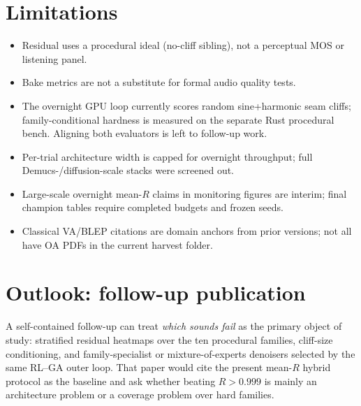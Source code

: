 \section{Limitations}
\label{sec:limitations}

\begin{itemize}
  \item Residual uses a procedural ideal (no-cliff sibling), not a perceptual MOS or listening panel.
  \item Bake metrics are not a substitute for formal audio quality tests.
  \item The overnight GPU loop currently scores random sine+harmonic seam cliffs; family-conditional hardness is measured on the separate Rust procedural bench. Aligning both evaluators is left to follow-up work.
  \item Per-trial architecture width is capped for overnight throughput; full Demucs-/diffusion-scale stacks were screened out.
  \item Large-scale overnight mean-$R$ claims in monitoring figures are interim; final champion tables require completed budgets and frozen seeds.
  \item Classical VA/BLEP citations are domain anchors from prior versions; not all have OA PDFs in the current harvest folder.
\end{itemize}

\section{Outlook: follow-up publication}
\label{sec:outlook}

A self-contained follow-up can treat \emph{which sounds fail} as the primary object of study: stratified residual heatmaps over the ten procedural families, cliff-size conditioning, and family-specialist or mixture-of-experts denoisers selected by the same RL--GA outer loop.
That paper would cite the present mean-$R$ hybrid protocol as the baseline and ask whether beating $R>0.999$ is mainly an architecture problem or a coverage problem over hard families.
